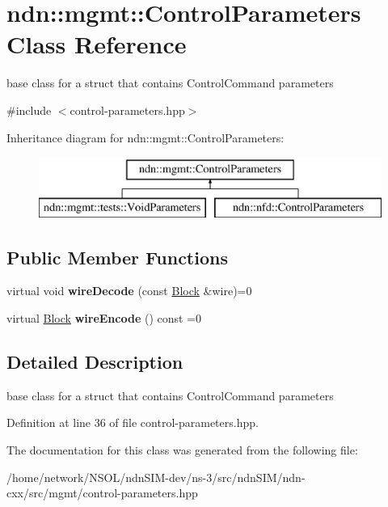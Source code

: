 \hypertarget{classndn_1_1mgmt_1_1ControlParameters}{}\section{ndn\+:\+:mgmt\+:\+:Control\+Parameters Class Reference}
\label{classndn_1_1mgmt_1_1ControlParameters}


base class for a struct that contains Control\+Command parameters  




{\ttfamily \#include $<$control-\/parameters.\+hpp$>$}

Inheritance diagram for ndn\+:\+:mgmt\+:\+:Control\+Parameters\+:\begin{figure}[H]
\begin{center}
\leavevmode
\includegraphics[height=2.000000cm]{classndn_1_1mgmt_1_1ControlParameters}
\end{center}
\end{figure}
\subsection*{Public Member Functions}
\begin{DoxyCompactItemize}
\item 
virtual void {\bfseries wire\+Decode} (const \hyperlink{classndn_1_1Block}{Block} \&wire)=0\hypertarget{classndn_1_1mgmt_1_1ControlParameters_a755f6c12b635c3b65ad723732c8d3569}{}\label{classndn_1_1mgmt_1_1ControlParameters_a755f6c12b635c3b65ad723732c8d3569}

\item 
virtual \hyperlink{classndn_1_1Block}{Block} {\bfseries wire\+Encode} () const =0\hypertarget{classndn_1_1mgmt_1_1ControlParameters_aa3ac08406dd118423d1b9ee335e58ac6}{}\label{classndn_1_1mgmt_1_1ControlParameters_aa3ac08406dd118423d1b9ee335e58ac6}

\end{DoxyCompactItemize}


\subsection{Detailed Description}
base class for a struct that contains Control\+Command parameters 

Definition at line 36 of file control-\/parameters.\+hpp.



The documentation for this class was generated from the following file\+:\begin{DoxyCompactItemize}
\item 
/home/network/\+N\+S\+O\+L/ndn\+S\+I\+M-\/dev/ns-\/3/src/ndn\+S\+I\+M/ndn-\/cxx/src/mgmt/control-\/parameters.\+hpp\end{DoxyCompactItemize}
